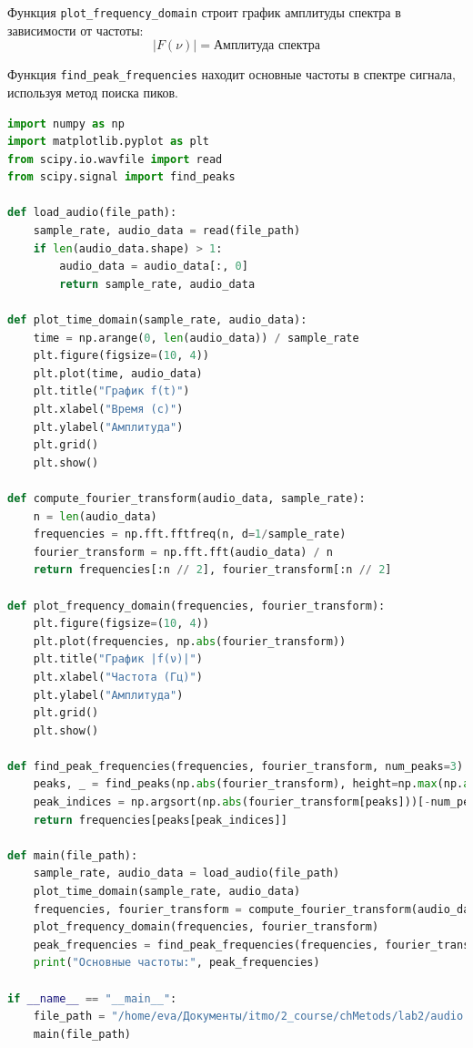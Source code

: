 \documentclass[a4paper,12pt]{article}
\begin{document}
Функция \texttt{plot\_frequency\_domain} строит график амплитуды спектра в зависимости от частоты:
\[
|F(\nu)| = \text{Амплитуда спектра}
\]

Функция \texttt{find\_peak\_frequencies} находит основные частоты в спектре сигнала, используя метод поиска пиков.


\begin{lstlisting}[language=Python, caption=Обработка аудиосигнала с использованием преобразования Фурье]
import numpy as np
import matplotlib.pyplot as plt
from scipy.io.wavfile import read
from scipy.signal import find_peaks

def load_audio(file_path):
    sample_rate, audio_data = read(file_path)
    if len(audio_data.shape) > 1:
        audio_data = audio_data[:, 0]
        return sample_rate, audio_data

def plot_time_domain(sample_rate, audio_data):
    time = np.arange(0, len(audio_data)) / sample_rate
    plt.figure(figsize=(10, 4))
    plt.plot(time, audio_data)
    plt.title("График f(t)")
    plt.xlabel("Время (с)")
    plt.ylabel("Амплитуда")
    plt.grid()
    plt.show()

def compute_fourier_transform(audio_data, sample_rate):
    n = len(audio_data)
    frequencies = np.fft.fftfreq(n, d=1/sample_rate)
    fourier_transform = np.fft.fft(audio_data) / n
    return frequencies[:n // 2], fourier_transform[:n // 2]

def plot_frequency_domain(frequencies, fourier_transform):
    plt.figure(figsize=(10, 4))
    plt.plot(frequencies, np.abs(fourier_transform))
    plt.title("График |f(ν)|")
    plt.xlabel("Частота (Гц)")
    plt.ylabel("Амплитуда")
    plt.grid()
    plt.show()

def find_peak_frequencies(frequencies, fourier_transform, num_peaks=3):
    peaks, _ = find_peaks(np.abs(fourier_transform), height=np.max(np.abs(fourier_transform)) * 0.1)
    peak_indices = np.argsort(np.abs(fourier_transform[peaks]))[-num_peaks:]
    return frequencies[peaks[peak_indices]]

def main(file_path):
    sample_rate, audio_data = load_audio(file_path)
    plot_time_domain(sample_rate, audio_data)
    frequencies, fourier_transform = compute_fourier_transform(audio_data, sample_rate)
    plot_frequency_domain(frequencies, fourier_transform)
    peak_frequencies = find_peak_frequencies(frequencies, fourier_transform)
    print("Основные частоты:", peak_frequencies)

if __name__ == "__main__":
    file_path = "/home/eva/Документы/itmo/2_course/chMetods/lab2/audio.wav"
    main(file_path)
\end{lstlisting}
\end{document}
